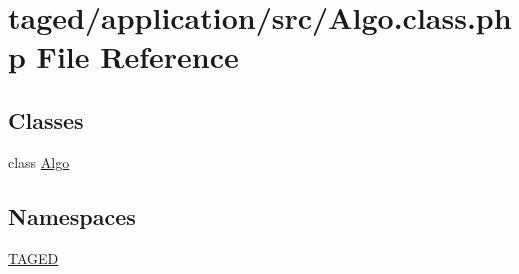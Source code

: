 \hypertarget{_algo_8class_8php}{}\section{taged/application/src/\+Algo.class.\+php File Reference}
\label{_algo_8class_8php}
\subsection*{Classes}
\begin{DoxyCompactItemize}
\item 
class \hyperlink{class_algo}{Algo}
\end{DoxyCompactItemize}
\subsection*{Namespaces}
\begin{DoxyCompactItemize}
\item 
 \hyperlink{namespace_t_a_g_e_d}{T\+A\+G\+ED}
\end{DoxyCompactItemize}
